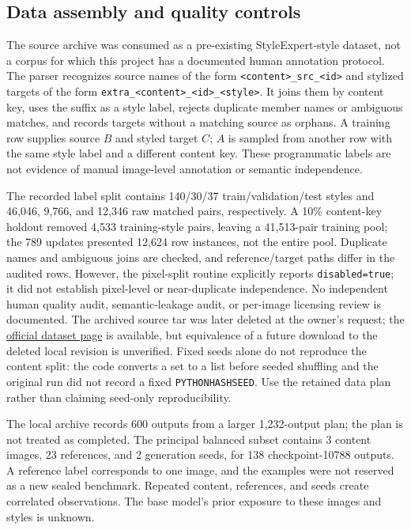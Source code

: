 \documentclass[10pt,letterpaper]{article}
\begin{document}
\subsection{Data assembly and quality controls}
The source archive was consumed as a pre-existing StyleExpert-style dataset, not a corpus for which this project has a documented human annotation protocol. The parser recognizes source names of the form \texttt{<content>\_src\_<id>} and stylized targets of the form \texttt{extra\_<content>\_<id>\_<style>}. It joins them by content key, uses the suffix as a style label, rejects duplicate member names or ambiguous matches, and records targets without a matching source as orphans. A training row supplies source $B$ and styled target $C$; $A$ is sampled from another row with the same style label and a different content key. These programmatic labels are not evidence of manual image-level annotation or semantic independence.

The recorded label split contains 140/30/37 train/validation/test styles and 46,046, 9,766, and 12,346 raw matched pairs, respectively. A 10\% content-key holdout removed 4,533 training-style pairs, leaving a 41,513-pair training pool; the 789 updates presented 12,624 row instances, not the entire pool. Duplicate names and ambiguous joins are checked, and reference/target paths differ in the audited rows. However, the pixel-split routine explicitly reports \texttt{disabled=true}; it did not establish pixel-level or near-duplicate independence. No independent human quality audit, semantic-leakage audit, or per-image licensing review is documented. The archived source tar was later deleted at the owner's request; the \href{https://huggingface.co/datasets/HH-LG/StyleExpert}{official dataset page} is available, but equivalence of a future download to the deleted local revision is unverified. Fixed seeds alone do not reproduce the content split: the code converts a set to a list before seeded shuffling and the original run did not record a fixed \texttt{PYTHONHASHSEED}. Use the retained data plan rather than claiming seed-only reproducibility.

The local archive records 600 outputs from a larger 1,232-output plan; the plan is not treated as completed. The principal balanced subset contains 3 content images, 23 references, and 2 generation seeds, for 138 checkpoint-10788 outputs. A reference label corresponds to one image, and the examples were not reserved as a new sealed benchmark. Repeated content, references, and seeds create correlated observations. The base model's prior exposure to these images and styles is unknown.
\end{document}
